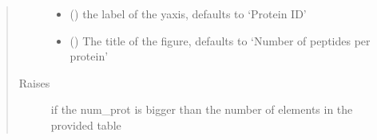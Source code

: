 \documentclass[letterpaper,10pt,english]{sphinxmanual}
\begin{document}
\begin{fulllineitems}
\begin{quote}
\begin{description}
\begin{itemize}
\item {} 
 (\sphinxstyleliteralemphasis{\sphinxupquote{, }}) \textendash{} the label of the y\sphinxhyphen{}axis, defaults to ‘Protein ID’

\item {} 
 (\sphinxstyleliteralemphasis{\sphinxupquote{, }}) \textendash{} The title of the figure, defaults to ‘Number of peptides per protein’

\end{itemize}

\item[{Raises}] \leavevmode
{} \textendash{} if the num\_prot is bigger than the number of elements in the provided table

\end{description}\end{quote}

\end{fulllineitems}

\end{document}
